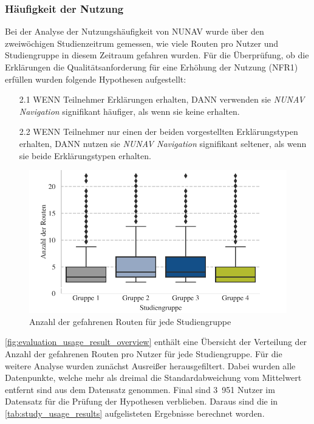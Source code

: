 \subsubsection{Häufigkeit der Nutzung}
\label{sec:06_model_evaluation:usage_analysis}

Bei der Analyse der Nutzungshäufigkeit von NUNAV wurde über den zweiwöchigen Studienzeitrum gemessen, wie viele Routen pro Nutzer und Studiengruppe in diesem Zeitraum gefahren wurden. Für die Überprüfung, ob die Erklärungen die Qualitätsanforderung für eine Erhöhung der Nutzung (NFR1) erfüllen wurden folgende Hypothesen aufgestellt:

\begin{enumerate}
    \item[2.1] WENN Teilnehmer Erklärungen erhalten, DANN verwenden sie \textit{NUNAV Navigation} signifikant häufiger, als wenn sie keine erhalten.
    \item[2.2] WENN Teilnehmer nur einen der beiden vorgestellten Erklärungstypen erhalten, DANN nutzen sie \textit{NUNAV Navigation} signifikant seltener, als wenn sie beide Erklärungstypen erhalten.
\end{enumerate}

\begin{figure}[b!]
    \centering
    \includegraphics[width=\textwidth]{contents/06_model_evaluation/02_evaluation/res/usage_result_overview.pdf}
    \caption{Anzahl der gefahrenen Routen für jede Studiengruppe}
    \label{fig:evaluation_usage_result_overview}
\end{figure}

\autoref{fig:evaluation_usage_result_overview} enthält eine Übersicht der Verteilung der Anzahl der gefahrenen Routen pro Nutzer für jede Studiengruppe. Für die weitere Analyse wurden zunächst Ausreißer herausgefiltert. Dabei wurden alle Datenpunkte, welche mehr als dreimal die Standardabweichung vom Mittelwert entfernt sind aus dem Datensatz genommen. Final sind 3~951 Nutzer im Datensatz für die Prüfung der Hypothesen verblieben. Daraus sind die in \autoref{tab:study_usage_results} aufgelisteten Ergebnisse berechnet worden.

